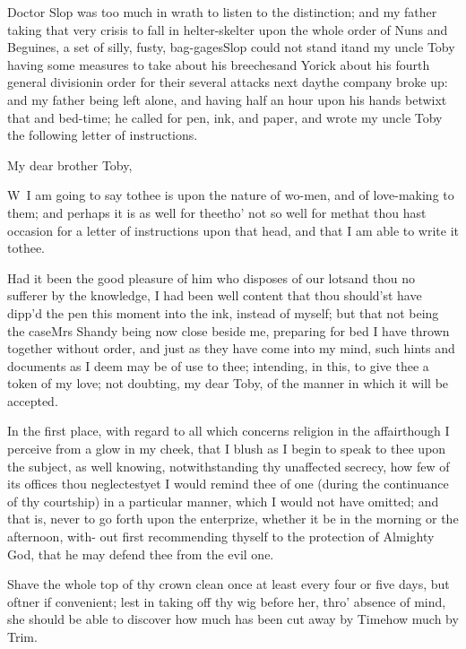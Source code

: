 \documentclass{article}
\begin{document}
Doctor Slop was too much in wrath to listen to the
distinction; and my father taking that very crisis to fall in
helter-skelter upon the whole order of Nuns and Beguines, a
set of silly, fusty, bag-\break gages\tsh Slop could not stand
it\tsh\break and my uncle Toby having some measures to take
about his breeches\tsk and Yorick about his fourth general
division\break\tsk in order for their several attacks next
day\tsk the company broke up: and my father being left alone, and
having half an hour upon his hands betwixt that and bed-time; he
called for pen, ink, and paper, and wrote my uncle Toby the
following letter of instructions.

\vfill {}\eject
\setlength{\baselineskip}{13.36pt} %
My dear brother Toby,

\vskip -6pt

\lettrine{W}{\,} I am going to say to\break thee is
upon the nature of wo-\break men, and of love-making to them; and perhaps
it is as well for thee\tsk tho’ not so well for
me\tsk that thou hast occasion for a letter of instructions upon
that head, and that I am able to write it to\break thee.

Had it been the good pleasure of him who disposes of our
lots\tsk and thou no sufferer by the knowledge, I had been well content that thou should’st have
dipp’d the pen this moment into the ink, instead of myself;
but that not being the case\tsh\tsk Mrs Shandy
being now close beside me, preparing for bed\tsh{}
I have thrown together without order, and just as they have come into my mind, such
hints and documents as I deem may be of use to thee; intending, in this, to give
thee a token of my love; not doubting, my dear Toby, of the manner in which it will
be accepted.

In the first place, with regard to all which concerns religion
in the affair\tsh\break though I perceive from a glow in my
cheek, that I blush as I begin to speak to thee upon the subject,
as well knowing, notwithstanding thy unaffected secrecy, how few of
its offices thou neglectest\tsk yet I would remind thee of one
(during the continuance of thy courtship) in a particular manner,
which I would not have omitted; and that is, never to go forth upon
the enterprize, whether it be in the morning or the afternoon,
with-
out first recommending thyself to the protection of Almighty
God, that he may defend thee from the evil one.

Shave the whole top of thy crown clean once at least every four
or five days, but oftner if convenient; lest in taking off thy wig
before her, thro’ absence of mind, she should be able to
discover how much has been cut away by Time\tsh how much
by Trim.
\end{document}
